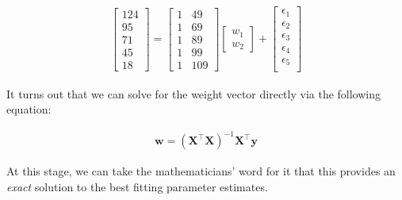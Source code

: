 \documentclass[
  letterpaper,
  DIV=11,
  numbers=noendperiod]{scrartcl}
\begin{document}
\[
\begin{aligned}
    \begin{bmatrix}
    124 \\
    95 \\
    71 \\
    45 \\
    18
    \end{bmatrix}
    =
    \begin{bmatrix}
    1 & 49 \\
    1 & 69 \\
    1 & 89 \\
    1 & 99 \\
    1 & 109
    \end{bmatrix}
    \begin{bmatrix}
    w_1 \\
    w_2
    \end{bmatrix}
    +
    \begin{bmatrix}
        \epsilon_1 \\
        \epsilon_2 \\
        \epsilon_3 \\
        \epsilon_4 \\
        \epsilon_5 \\
    \end{bmatrix}
\end{aligned}
\]

It turns out that we can solve for the weight vector directly via the
following equation:

\[
\begin{align}
\mathbf{w} = (\mathbf{X}^\top \mathbf{X})^{-1} \mathbf{X}^\top \mathbf{y}
\end{align}
\]

At this stage, we can take the mathematicians' word for it that this
provides an \emph{exact} solution to the best fitting parameter
estimates.
\end{document}
